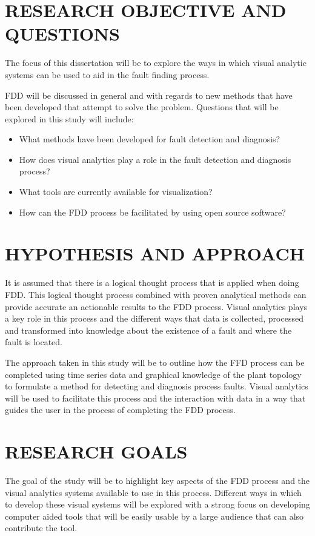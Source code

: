 \section{RESEARCH OBJECTIVE AND QUESTIONS}

The focus of this dissertation will be to explore the ways in which visual analytic systems can be used to aid in the fault finding process. \par
FDD will be discussed in general and with regards to new methods that have been developed that attempt to solve the problem.
Questions that will be explored in this study will include:
\begin{itemize}
\item What methods have been developed for fault detection and diagnosis?
\item How does visual analytics play a role in the fault detection and diagnosis process?
\item What tools are currently available for visualization?
\item How can the FDD process be facilitated by using open source software?
\end{itemize}

\section{HYPOTHESIS AND APPROACH}

It is assumed that there is a logical thought process that is applied when doing FDD. This logical thought process combined with proven analytical methods can provide accurate an actionable results to the FDD process. Visual analytics plays a key role in this process and the different ways that data is collected, processed and transformed into knowledge about the existence of a fault and where the fault is located.

The approach taken in this study will be to outline how the FFD process can be completed using time series data and graphical knowledge of the plant topology to formulate a method for detecting and diagnosis process faults. Visual analytics will be used to facilitate this process and the interaction with data in a way that guides the user in the process of completing the FDD process.

\section{RESEARCH GOALS}

The goal of the study will be to highlight key aspects of the FDD process and the visual analytics systems available to use in this process. Different ways in which to develop these visual systems will be explored with a strong focus on developing computer aided tools that will be easily usable by a large audience that can also contribute the tool.

